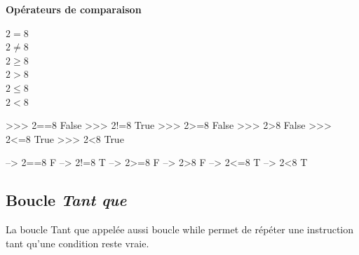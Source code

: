 \documentclass[10pt]{article}
\begin{document}
\begin{defi}
\textbf{Opérateurs de comparaison}


\begin{minipage}[c]{.3\linewidth}

\begin{pseudo}
\begin{algorithm}[H]
$2=8 $ \\
$2\neq8 $\\
$2\geq 8 $\\
$2>8 $\\
$2\leq 8$\\
$2<8$\\
\end{algorithm}
\end{pseudo}

\end{minipage} \hfill
\begin{minipage}[c]{.3\linewidth}
\begin{py}
\begin{python}
 >>> 2==8
	False
 >>> 2!=8
	True
 >>> 2>=8
	False
 >>> 2>8
	False
 >>> 2<=8
	True
 >>> 2<8
	True
\end{python}
\end{py}
\end{minipage} \hfill
\begin{minipage}[c]{.3\linewidth}
\begin{sci}
\begin{scilab}
 --> 2==8
	F
 --> 2!=8
	T
 --> 2>=8
	F
 --> 2>8
	F
 --> 2<=8
	T
 --> 2<8
	T
\end{scilab}
\end{sci}
\end{minipage}

\end{defi}



\subsection{Boucle \textsl{Tant que}}

\begin{defi}
La boucle \textsf{Tant que} appelée aussi boucle \textsf{while} permet de répéter une instruction tant qu'une condition reste vraie.
\end{defi}
\end{document}
